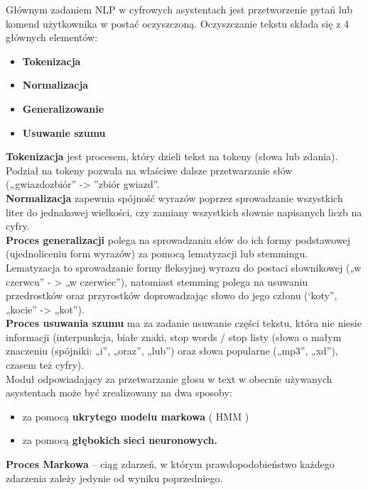 Głównym zadaniem NLP w cyfrowych asystentach jest przetworzenie pytań lub komend użytkownika w postać oczyszczoną. Oczyszczanie tekstu składa się z 4 głównych elementów:

\begin{itemize}
	\item \textbf{Tokenizacja} 
	\item \textbf{Normalizacja} 
	\item \textbf{Generalizowanie} 
	\item \textbf{Usuwanie szumu} \\
\end{itemize}

\textbf{Tokenizacja} jest procesem, który dzieli tekst na tokeny (słowa lub zdania). Podział na tokeny pozwala na właściwe dalsze przetwarzanie słów („gwiazdozbiór” -> ”zbiór gwiazd”. \\

\textbf{Normalizacja} zapewnia spójność wyrazów poprzez sprowadzanie wszystkich liter do jednakowej wielkości, czy zamiany wszystkich słownie napisanych liczb na cyfry. \\

\textbf{Proces generalizacji} polega na sprowadzaniu słów do ich formy podstawowej (ujednoliceniu form wyrazów) za pomocą lematyzacji lub stemmingu. Lematyzacja to sprowadzanie formy fleksyjnej wyrazu do postaci słownikowej („w czerwcu” - > „w czerwiec”), natomiast stemming polega na usuwaniu przedrostków oraz przyrostków doprowadzając słowo do jego członu (‘koty”, „kocie” -> „kot”). \\

\textbf{Proces usuwania szumu} ma za zadanie usuwanie części tekstu, która nie niesie informacji (interpunkcja, białe znaki, stop words / stop listy (słowa o małym znaczeniu (spójniki: „i”, „oraz”, „lub”) oraz słowa popularne („mp3”, „xd”), czasem też cyfry). \\

Moduł odpowiadający za przetwarzanie głosu w text w obecnie używanych asystentach może być zrealizowany na dwa sposoby: 

\begin{itemize}
	\item za pomocą \textbf{ukrytego modelu markowa} ( HMM )
	\item za pomocą \textbf{głębokich sieci neuronowych.} \\
\end{itemize} 

\textbf{Proces Markowa} – ciąg zdarzeń, w którym prawdopodobieństwo każdego zdarzenia zależy jedynie od wyniku poprzedniego. \\

